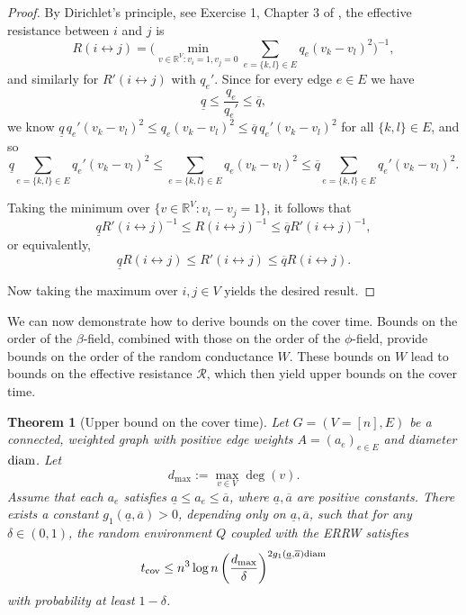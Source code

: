 \documentclass[a4paper, 11pt]{article}
\newcommand{\diam}{\textnormal{diam}}
\newcommand{\cov}{\textnormal{cov}}
\newcommand{\mr}{\mathcal{R}}
\newtheorem{thm}{Theorem}[section]
\begin{document}
\begin{proof}
By Dirichlet's principle, see Exercise 1, Chapter 3 of \cite{DS84}, the effective resistance between \( i \) and \( j \) is
\[
R(i \leftrightarrow j) = \bigg(\min_{v\in\mathbb{R}^V : v_i=1, v_j=0} \sum_{e=\{k,l\} \in E} q_e (v_k-v_l)^2\bigg)^{-1},
\]
and similarly for \( R'(i \leftrightarrow j) \) with \( q_e' \). 
Since for every edge $e\in E$ we have
\[
\underline{q} \leq \frac{q_e}{q_e'} \leq \overline{q},
\]
we know $\underline{q}\,q_e'(v_k-v_l)^2\leq q_e (v_k-v_l)^2\leq \overline{q}\,q_e'(v_k-v_l)^2$ 
for all $\{k,l\} \in E$, and so
\[\underline{q}\sum_{e=\{k,l\} \in E}q_e'(v_k-v_l)^2\leq \sum_{e=\{k,l\} \in E}q_e (v_k-v_l)^2\leq \overline{q}\sum_{e=\{k,l\} \in E}q_e'(v_k-v_l)^2.\]

Taking the minimum over $\{v\in\mathbb{R}^V : v_i - v_j = 1\}$, it follows that
\[
\underline{q} R'(i \leftrightarrow j)^{-1} \leq R(i \leftrightarrow j)^{-1} \leq \overline{q} R'(i \leftrightarrow j)^{-1},
\]
or equivalently,
\[
\underline{q} R(i \leftrightarrow j) \leq R'(i \leftrightarrow j) \leq \overline{q} R(i \leftrightarrow j).
\]

Now taking the maximum over \( i, j \in V\) yields the desired result.
\end{proof}

We can now demonstrate how to derive bounds on the cover time. Bounds on the order of the \( \beta \)-field, combined with those on the order of the \( \phi \)-field, provide bounds on the order of the random conductance \( W \). These bounds on \( W \) lead to bounds on the effective resistance \( \mr \), which then yield upper bounds on the cover time.

\vspace{.3em}
\begin{thm}[Upper bound on the cover time]
\label{thm:bound_cover}
Let $G=(V=[n],E)$ be a connected, weighted graph with positive edge weights
$A=(a_e)_{e\in E}$ and diameter $\diam$. Let
\[
d_{\max}:=\max_{v\in V}\deg(v).
\]
Assume that each $a_e$ satisfies $\underline a\le a_e\le \overline a$, where
$\underline a,\overline a$ are positive constants. There exists a constant \(g_1(\underline a,\overline a)>0\), depending only on
\(\underline a,\overline a\), such that for any \(\delta\in(0,1)\), the random environment $Q$ coupled with the ERRW satisfies
\[
t_\cov
\le
n^3\log n
\left(\frac{d_{\max}}{\delta}\right)^{2g_1(\underline a,\overline a)\diam}
\]
with probability at least $1-\delta$.
\end{thm}
\end{document}
